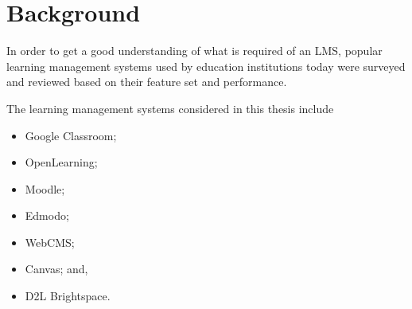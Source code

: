 \chapter{Background}\label{ch:background}
In order to get a good understanding of what is required of an LMS, popular learning management systems used by education institutions today were surveyed and reviewed based on their feature set and performance.

The learning management systems considered in this thesis include

\begin{itemize}
    \item Google Classroom;
    \item OpenLearning;
    \item Moodle;
    \item Edmodo;
    \item WebCMS;
    \item Canvas; and,
    \item D2L Brightspace.
\end{itemize}

\newpage

